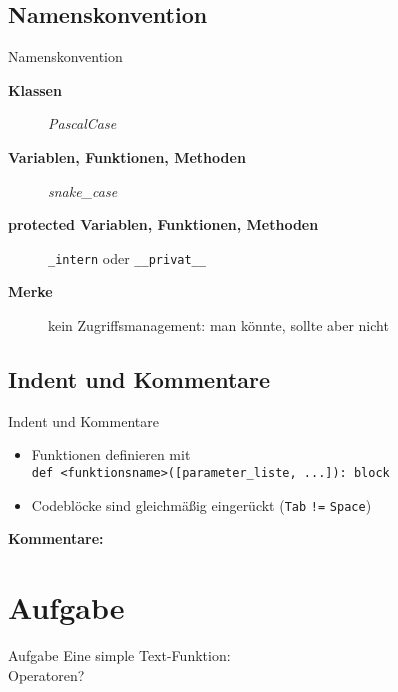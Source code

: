 \subsection{Namenskonvention}
\begin{frame}[fragile]{Namenskonvention}
	\begin{description}
		\item[\textbf{Klassen}] \textit{PascalCase}
		\item[\textbf{Variablen, Funktionen, Methoden}] \textit{snake\_case} \\
		\item[\textbf{protected Variablen, Funktionen, Methoden}] \alert{\texttt{\_intern}} oder \alert{\texttt{\_\_privat\_\_}}
		\item[\textbf{Merke}] kein Zugriffsmanagement: man könnte, sollte aber nicht
	\end{description}
\end{frame}
\subsection{Indent und Kommentare}
\begin{frame}[fragile]{Indent und Kommentare}
	\begin{itemize}
		\item Funktionen definieren mit \\
			\texttt{def <funktionsname>([parameter\_liste, ...]): block}
		\item Codeblöcke sind gleichmäßig eingerückt (\texttt{Tab} \alert{\texttt{!=}} \texttt{Space}) \\
	\end{itemize}
	\textbf{Kommentare:}
	
\end{frame}

\section{Aufgabe}
\begin{frame}[fragile]{Aufgabe}
	Eine simple Text-Funktion: \\[.5cm]
	
	\onslide<2->
	\onslide<3->
	\onslide<4-> Operatoren?
\end{frame}



